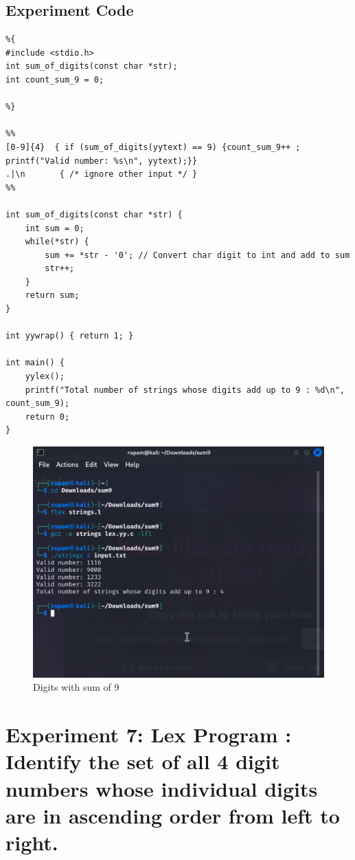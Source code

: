 \documentclass[12pt]{article}
\begin{document}
\subsection*{Experiment Code}
\begin{lstlisting}
%{
#include <stdio.h>
int sum_of_digits(const char *str);
int count_sum_9 = 0;

%}

%%
[0-9]{4}  { if (sum_of_digits(yytext) == 9) {count_sum_9++ ; printf("Valid number: %s\n", yytext);}}
.|\n       { /* ignore other input */ }
%%

int sum_of_digits(const char *str) {
    int sum = 0;
    while(*str) {
        sum += *str - '0'; // Convert char digit to int and add to sum
        str++;
    }
    return sum;
}

int yywrap() { return 1; }

int main() {
    yylex();
    printf("Total number of strings whose digits add up to 9 : %d\n", count_sum_9);
    return 0;
}
\end{lstlisting}
\begin{figure}[H]
    \centering
    \includegraphics[width=1\linewidth]{exp6output.png}
    \caption{Digits with sum of 9}
\end{figure}

\newpage
\section*{Experiment 7: Lex Program : Identify the set of all 4 digit numbers whose individual digits are in ascending order from left to right.}
\end{document}
